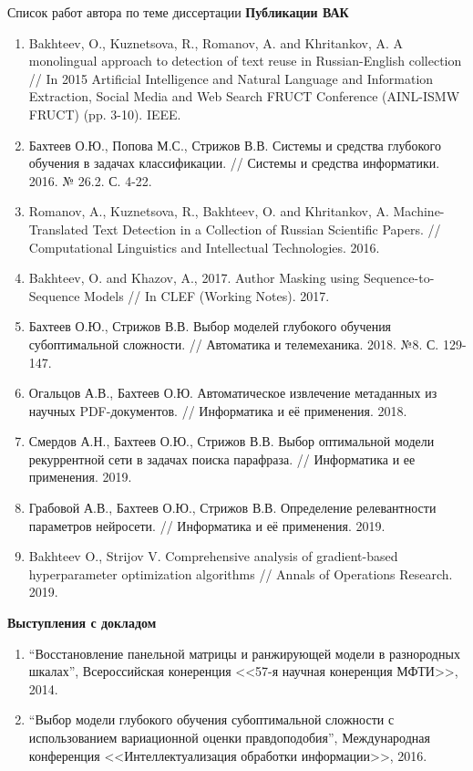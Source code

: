 \documentclass[usenames,dvipsnames,11pt,pdf,utf8,russian,aspectratio=43]{beamer}
\begin{document}
\begin{frame}{Список работ автора по теме диссертации}
\tiny
\textbf{Публикации ВАК}
\begin{enumerate}
\item Bakhteev, O., Kuznetsova, R., Romanov, A. and Khritankov, A. A monolingual approach to detection of text reuse in Russian-English collection // In 2015 Artificial Intelligence and Natural Language and Information Extraction, Social Media and Web Search FRUCT Conference (AINL-ISMW FRUCT) (pp. 3-10). IEEE.

\item Бахтеев О.Ю., Попова М.С., Стрижов В.В. Системы и средства глубокого обучения в задачах классификации. // Системы и средства информатики. 2016. № 26.2. С. 4-22.
\item Romanov, A., Kuznetsova, R., Bakhteev, O. and Khritankov, A. Machine-Translated Text Detection in a Collection of Russian Scientific Papers. // Computational Linguistics and Intellectual Technologies. 2016. 
\item Bakhteev, O. and Khazov, A., 2017. Author Masking using Sequence-to-Sequence Models // In CLEF (Working Notes). 2017.
\item Бахтеев О.Ю., Стрижов В.В. Выбор моделей глубокого обучения субоптимальной сложности. // Автоматика и телемеханика. 2018. №8. С. 129-147.
\item Огальцов А.В., Бахтеев О.Ю. Автоматическое извлечение метаданных из научных PDF-документов. // Информатика и её применения. 2018.
\item Смердов А.Н., Бахтеев О.Ю., Стрижов В.В. Выбор оптимальной модели рекуррентной сети в задачах поиска парафраза. // Информатика и ее применения. 2019.
\item Грабовой А.В., Бахтеев О.Ю., Стрижов В.В. Определение релевантности параметров нейросети. // Информатика и её применения. 2019.
\item Bakhteev O., Strijov V. Comprehensive analysis of gradient-based hyperparameter optimization algorithms // Annals of Operations Research. 2019.
\end{enumerate}
\textbf{Выступления с докладом}
\begin{enumerate}
\item ``Восстановление панельной матрицы и ранжирующей модели в разнородных шкалах'', Всероссийская конеренция <<57-я научная конеренция МФТИ>>, 2014.
\item ``Выбор модели глубокого обучения субоптимальной сложности с использованием вариационной оценки правдоподобия'', Международная конференция <<Интеллектуализация обработки информации>>, 2016.

\end{enumerate}
\end{frame}
\end{document}
